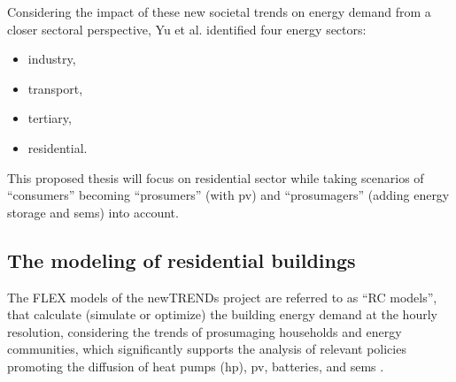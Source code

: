 
Considering the impact of these new societal trends on energy demand from a closer sectoral perspective,
Yu et al. \cite{newtrends} identified four energy sectors: 

\begin{itemize}
  \item industry, 
  \item transport,  
  \item tertiary, 
  \item residential.  
\end{itemize}

This proposed thesis will focus on residential sector 
while taking scenarios of “consumers” becoming “prosumers” (with \gls{pv}) and “prosumagers” (adding energy storage and \gls{sems}) \cite{consumer} into account.  


\subsection{The modeling of residential buildings}


The FLEX models of the newTRENDs project are referred to as “RC models”,
that calculate (simulate or optimize) the building energy demand at the hourly resolution,
considering the trends of prosumaging households and energy communities, 
which significantly supports the analysis of relevant policies promoting the diffusion of heat pumps (\gls{hp}), \gls{pv}, batteries, and \gls{sems} \cite{newtrends}.


